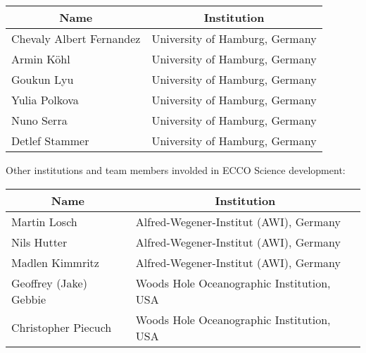 \begin{center}
\begin{tabular}{m{} m{} }
    \multicolumn{1}{c}{\textbf{Name}} & \multicolumn{1}{c}{\textbf{Institution}} \\ \hline
    Chevaly Albert Fernandez & University of Hamburg, Germany \\ \hline
    Armin Köhl & University of Hamburg, Germany \\ \hline
    Goukun Lyu & University of Hamburg, Germany \\ \hline
    Yulia Polkova & University of Hamburg, Germany \\ \hline
    Nuno Serra & University of Hamburg, Germany \\ \hline
    Detlef Stammer & University of Hamburg, Germany \\ \hline
\end{tabular}
\end{center}


\vspace{.25cm}
\begin{center}
Other institutions and team members involded in ECCO Science development:
\end{center}

\vspace{.25cm}
\begin{center}
\begin{tabular}{m{} m{} }
    \multicolumn{1}{c}{\textbf{Name}} & \multicolumn{1}{c}{\textbf{Institution}} \\ \hline
    Martin Losch & Alfred-Wegener-Institut (AWI), Germany\\ \hline
    Nils Hutter & Alfred-Wegener-Institut (AWI), Germany\\ \hline
    Madlen Kimmritz & Alfred-Wegener-Institut (AWI), Germany\\ \hline
    Geoffrey (Jake) Gebbie & Woods Hole Oceanographic Institution, USA\\ \hline
    Christopher Piecuch & Woods Hole Oceanographic Institution, USA\\ \hline
\end{tabular}
\end{center}
